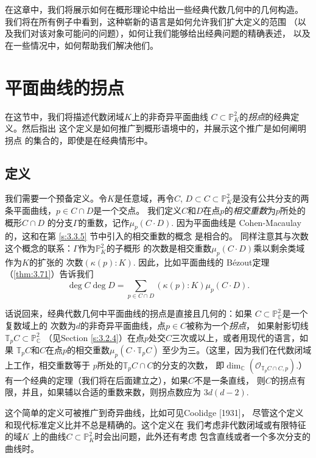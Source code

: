 在这章中，我们将展示如何在概形理论中给出一些经典代数几何中的几何构造。
我们将在所有例子中看到，这种崭新的语言是如何允许我们扩大定义的范围
（以及我们对该对象可能问的问题），如何让我们能够给出经典问题的精确表述，
以及在一些情况中，如何帮助我们解决他们。

\section{平面曲线的拐点}\label{s:4.1}

在这节中，我们将描述代数闭域$K$上的非奇异平面曲线
$C\subset \mathbb P_K^2$的\textit{拐点}的经典定义。然后指出
这个定义是如何推广到概形语境中的，并展示这个推广是如何阐明拐点
的集合的，即使是在经典情形中。

\subsection{定义}\label{s:4.1.1}

我们需要一个预备定义。令$K$是任意域，再令$C$, $D\subset C\subset \mathbb P_K^2$是没有公共分支的两条平面曲线，$p\in C\cap D$是一个交点。
我们定义$C$和$D$在点$p$的\textit{相交重数}为$p$所处的概形$C\cap D$
的分支$\Gamma$的重数，记作$\mu_p(C\cdot D)$. 因为平面曲线是
Cohen-Macaulay的，这和在第 \ref{s:3.3.5} 节中引入的相交重数的概念
是相合的。%
同样注意其与次数这个概念的联系：$\Gamma$作为$\mathbb P_K^2$的子概形
的次数是相交重数$\mu_p(C\cdot D)$乘以剩余类域作为$K$的扩张的
次数$(\kappa(p):K)$. 因此，比如平面曲线的
B\'ezout定理（\ref{thm:3.71}）告诉我们
\[
	\deg C\deg D=\sum_{p\in C\cap D}
	(\kappa(p):K)\mu_p(C\cdot D).
\]

话说回来，经典代数几何中平面曲线的拐点是直接且几何的：如果
$C\subset \mathbb P_{\mathbb C}^2$是一个复数域上的
次数为$d$的非奇异平面曲线，点$p\in C$被称为一个\textit{拐点}，
如果射影切线$\mathbb T_pC\subset \mathbb P_{\mathbb C}^2$
（见Section \ref{s:3.2.4}）在点$p$处交$C$三次或以上，或者用现代的语言，如果
$\mathbb T_pC$和$C$在点$p$的相交重数$\mu_p(C\cdot \mathbb T_pC)$
至少为三。（这里，因为我们在代数闭域上工作，相交重数等于
$p$所处的$\mathbb T_pC\cap C$的分支的次数，
即$\dim_{\mathbb C}(\mathscr O_{\mathbb T_pC\cap C,p})$.）
有一个经典的定理（我们将在后面建立之），如果$C$不是一条直线，
则$C$的拐点有限，并且，如果辅以合适的重数来数，则拐点数应为
$3d(d-2)$.

这个简单的定义可被推广到奇异曲线，比如可见Coolidge [1931]，
尽管这个定义和现代标准定义比并不总是精确的。这个定义在
我们考虑非代数闭域或有限特征的域$K$
上的曲线$C\subset \mathbb P_K^2$时会出问题，此外还有考虑
包含直线或者一个多次分支的曲线时。

